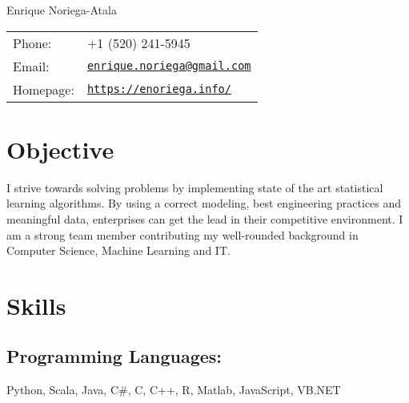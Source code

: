 \documentclass[letterpaper]{article}
\def\name{Enrique Noriega-Atala}
\renewenvironment{itemize}{
  \begin{list}{}{
    \setlength{\leftmargin}{1.5em}
  }
}{
  \end{list}
}
\begin{document}
{\huge \name}


\vspace{0.25in}

\begin{minipage}{0.45\linewidth}
  \begin{tabular}{ll}
    Phone: & +1 (520) 241-5945 \\
    Email: & \href{mailto:enrique.noriega@gmail.com}{\tt enrique.noriega@gmail.com} \\
    Homepage: & \href{https://enoriega.info/}{\tt https://enoriega.info/} \\
  \end{tabular}
\end{minipage}


%

\section*{Objective}
I strive towards solving problems by implementing state of the art statistical learning algorithms. By using a correct modeling, best engineering practices and meaningful data, enterprises can get the lead in their competitive environment. I am a strong team member contributing my well-rounded background in Computer Science, Machine Learning and IT.


\section*{Skills}
\subsection*{Programming Languages:}
\begin{itemize}
	\item Python, Scala, Java, C\#, C, C++, R, Matlab, JavaScript, VB.NET
\end{itemize}
\end{document}
